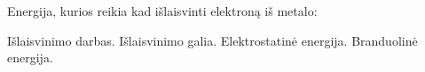 \question Energija, kurios reikia kad išlaisvinti elektroną iš metalo: \begin{choices}
    \choice Išlaisvinimo darbas.
    \choice Išlaisvinimo galia.
    \choice Elektrostatinė energija.
    \choice Branduolinė energija.
\end{choices}